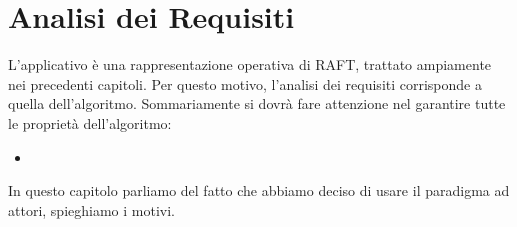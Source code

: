 \section{Analisi dei Requisiti} \label{Actors}
L'applicativo è una rappresentazione operativa di RAFT, trattato ampiamente nei precedenti capitoli. Per questo motivo, l'analisi dei requisiti corrisponde a quella dell'algoritmo.
Sommariamente si dovrà fare attenzione nel garantire tutte le proprietà dell'algoritmo:
\begin{itemize}
	\item 
\end{itemize}


In questo capitolo parliamo del fatto che abbiamo deciso di usare il paradigma ad attori, spieghiamo i motivi.

